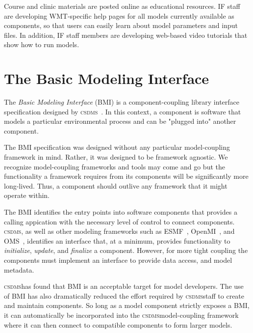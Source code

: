 \documentclass[11pt, oneside]{amsart}
\DeclareRobustCommand{\csdms}{\textsc{csdms}}
\begin{document}
Course and clinic materials are posted online as educational resources. IF staff are developing WMT-specific help pages for all models currently available as components, so that users can easily learn about model parameters and input files. In addition, IF staff members are developing web-based video tutorials that show how to run models.

\section{The Basic Modeling Interface}

The \emph{Basic Modeling Interface} (BMI) is a component-coupling library
interface specification designed by \csdms~\cite{peckham2012component,
syvitski2014plug}.  In this context, a component is software that models a
particular environmental process and can be "plugged into" another component.

The BMI specification was designed without any particular model-coupling
framework in mind.  Rather, it was designed to be framework agnostic. We
recognize model-coupling frameworks and tools may come and go but the
functionality a framework requires from its components will be significantly
more long-lived. Thus, a component should outlive any framework that it might
operate within.

The BMI identifies the entry points into software components that provides a
calling appication with the necessary level of control to connect components.
\csdms, as well as other modeling frameworks such as
ESMF~\cite{hill2004architecture}, OpenMI~\cite{gregersen2007openmi}, and
OMS~\cite{david2002object}, identifies an interface that, at a minimum,
provides functionality to \emph{initialize}, \emph{update}, and
\emph{finalize} a component. However, for more tight coupling the components
must implement an interface to provide data access, and model metadata.

\csdms has found that BMI is an acceptable target for model developers. The use
of BMI has also dramatically reduced the effort required by \csdms staff to
create and maintain components. So long as a model component strictly exposes
a BMI, it can automatically be incorporated into the \csdms model-coupling
framework where it can then connect to compatible components to form larger
models.

\end{document}
